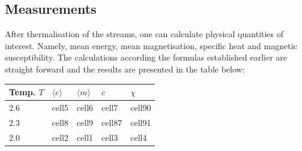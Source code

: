 \documentclass[11pt, a4paper]{scrartcl}
\begin{document}
\subsection{Measurements}
After thermalisation of the streams, one can calculate physical quantities of interest. Namely, mean energy, mean magnetisation, specific heat and magnetic susceptibility. The calculations according the formulas established earlier are straight forward and the results are presented in the table below:
\begin{center}
\begin{tabular}{ | m{2cm} || m{2cm}| m{2cm} | m{2cm} | m{2cm} | }
  \hline
  Temp. $T$ & $\langle e \rangle$ & $\langle m \rangle$ & $c$ & $\chi$\\
  \hline
  2.6 & cell5 & cell6 & cell7 & cell90\\
  \hline
  2.3 & cell8 & cell9 & cell87 & cell91\\
  \hline
  2.0 & cell2 & cell1 & cell3 & cell4 \\
  \hline
\end{tabular}
\end{center}
\end{document}
